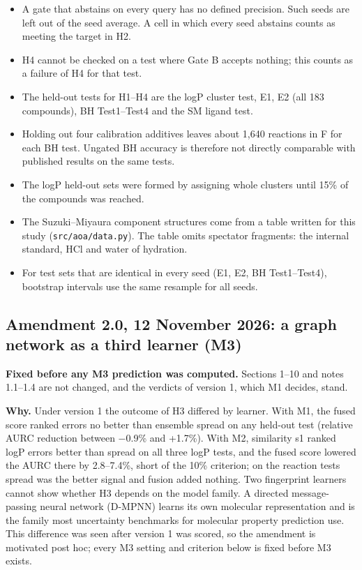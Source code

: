\begin{itemize}
\tightlist
\item
  A gate that abstains on every query has no defined precision. Such
  seeds are left out of the seed average. A cell in which every seed
  abstains counts as meeting the target in H2.
\item
  H4 cannot be checked on a test where Gate B accepts nothing; this
  counts as a failure of H4 for that test.
\item
  The held-out tests for H1--H4 are the logP cluster test, E1, E2 (all
  183 compounds), BH Test1--Test4 and the SM ligand test.
\item
  Holding out four calibration additives leaves about 1,640 reactions in
  F for each BH test. Ungated BH accuracy is therefore not directly
  comparable with published results on the same tests.
\item
  The logP held-out sets were formed by assigning whole clusters until
  15\% of the compounds was reached.
\item
  The Suzuki--Miyaura component structures come from a table written for
  this study (\texttt{src/aoa/data.py}). The table omits spectator
  fragments: the internal standard, HCl and water of hydration.
\item
  For test sets that are identical in every seed (E1, E2, BH
  Test1--Test4), bootstrap intervals use the same resample for all
  seeds.
\end{itemize}

\hypertarget{amendment-20-12-november-2026-a-graph-network-as-a-third-learner-m3}{%
\subsection{Amendment 2.0, 12 November 2026: a graph network as a third
learner
(M3)}\label{amendment-20-12-november-2026-a-graph-network-as-a-third-learner-m3}}

\textbf{Fixed before any M3 prediction was computed.} Sections 1--10 and
notes 1.1--1.4 are not changed, and the verdicts of version 1, which M1
decides, stand.

\textbf{Why.} Under version 1 the outcome of H3 differed by learner.
With M1, the fused score ranked errors no better than ensemble spread on
any held-out test (relative AURC reduction between −0.9\% and +1.7\%).
With M2, similarity s1 ranked logP errors better than spread on all
three logP tests, and the fused score lowered the AURC there by
2.8--7.4\%, short of the 10\% criterion; on the reaction tests spread
was the better signal and fusion added nothing. Two fingerprint learners
cannot show whether H3 depends on the model family. A directed
message-passing neural network (D-MPNN) learns its own molecular
representation and is the family most uncertainty benchmarks for
molecular property prediction use. This difference was seen after
version 1 was scored, so the amendment is motivated post hoc; every M3
setting and criterion below is fixed before M3 exists.

